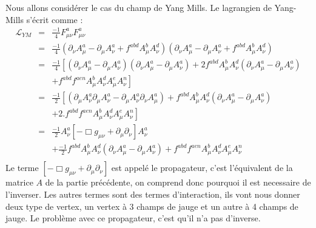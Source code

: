 \documentclass[a4paper,11pt]{article}
\theoremstyle{plain}
\theoremstyle{definition}
\theoremstyle{remark}
\numberwithin{equation}{section}
\numberwithin{equation}{subsection}
\numberwithin{figure}{section}
\begin{document}
\noindent
Nous allons considérer le cas du champ de Yang Mills. Le lagrangien de Yang-Mills s'écrit comme :
\begin{eqnarray}
\mathcal{L}_{YM}   &=&  \frac{-1}{4} F^{a}_{\mu\nu}F^{a}_{\mu \nu}  \\
                                  &=&   \frac{-1}{4} 
\left(   \partial_{\nu}A^{a}_{\mu} - \partial_{\mu}A^{a}_{\nu} + f^{abd}A^{b}_{\mu}A^{d}_{\nu}  \right)
\left(   \partial_{\nu}A^{a}_{\mu} - \partial_{\mu}A^{a}_{\nu} + f^{abd}A^{b}_{\mu}A^{d}_{\nu}  \right)  \\
                                  &=&   \frac{-1}{4}  
\left[
\left(   \partial_{\nu}A^{a}_{\mu} - \partial_{\mu}A^{a}_{\nu} \right)
\left(   \partial_{\nu}A^{a}_{\mu} - \partial_{\mu}A^{a}_{\nu} \right)
+ 2 f^{abd}  A^{b}_{\mu}A^{d}_{\nu}  \left(   \partial_{\nu}A^{a}_{\mu} - \partial_{\mu}A^{a}_{\nu} \right)  \right. \nonumber \\
&& \left. +  f^{abd}  f^{aen}  A^{b}_{\mu}A^{d}_{\nu}  A^{e}_{\mu}A^{n}_{\nu}
\right] \\
                                  &=&   \frac{-1}{2}  \left[
\left(   \partial_{\mu}A^{a}_{\nu} \partial_{\mu}A^{a}_{\nu} - \partial_{\mu}A^{a}_{\nu} \partial_{\nu}A^{a}_{\mu}\right)
+  f^{abd}  A^{b}_{\mu}A^{d}_{\nu}  \left(   \partial_{\nu}A^{a}_{\mu} - \partial_{\mu}A^{a}_{\nu} \right) \right. \nonumber  \\
&& \left. +  2. f^{abd}  f^{aen}  A^{b}_{\mu}A^{d}_{\nu}  A^{e}_{\mu}A^{n}_{\nu}  \right]  \\
                                 &=&   \frac{-1}{2}
A^{a}_{\nu}  \left[   - \Box g_{\mu \nu} +  \partial_{\mu} \partial_{\nu}  \right] A^{a}_{\nu} \\
&&    +   \frac{-1}{2}  f^{abd}  A^{b}_{\mu}A^{d}_{\nu}  \left(   \partial_{\nu}A^{a}_{\mu} - \partial_{\mu}A^{a}_{\nu} \right)
+   f^{abd}  f^{aen}  A^{b}_{\mu}A^{d}_{\nu}  A^{e}_{\mu}A^{n}_{\nu}   \nonumber \\
\end{eqnarray}
Le terme $\left[   - \Box g_{\mu \nu} +  \partial_{\mu} \partial_{\nu}  \right]$ est appelé le propagateur, c'est l'équivalent de 
la matrice $A$ de la partie précédente, on comprend donc pourquoi il est necessaire de l'inverser. Les autres termes sont des termes d'interaction, 
ils vont nous donner deux type de vertex, un vertex à 3 champs de jauge et un autre à 4 champs de jauge.
Le problème avec ce propagateur, c'est qu'il n'a pas d'inverse.\\
\end{document}
